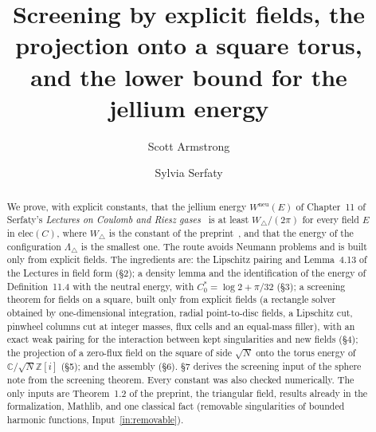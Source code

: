 \documentclass[11pt]{article}
\title{Screening by explicit fields, the projection onto a square torus,\\
and the lower bound for the jellium energy}
\author{Scott Armstrong \and Sylvia Serfaty}
\date{}
\theoremstyle{definition}
\theoremstyle{remark}
\newcommand{\C}{\mathbb C}
\newcommand{\Z}{\mathbb Z}
\newcommand{\Wneu}{W^{\mathrm{neu}}}
\begin{document}
\maketitle

\begin{abstract}
We prove, with explicit constants, that the jellium energy $\Wneu(E)$ of Chapter~11 of Serfaty's
\emph{Lectures on Coulomb and Riesz gases}~\cite{Lectures} is at least $W_\triangle/(2\pi)$ for every field
$E$ in $\mathrm{elec}(C)$, where $W_\triangle$ is the constant of the preprint~\cite{Preprint}, and that the
energy of the configuration $\Lambda_\triangle$ is the smallest one.  The route avoids Neumann problems and is
built only from explicit fields.  The ingredients are: the Lipschitz pairing and Lemma~4.13 of the Lectures in field
form (\S2); a density lemma and the identification of the energy of Definition~11.4 with the neutral energy, with
$C_0^\ast=\log2+\pi/32$ (\S3); a screening theorem for fields on a square, built only from
explicit fields (a rectangle solver obtained by one-dimensional integration, radial point-to-disc fields, a
Lipschitz cut, pinwheel columns cut at integer masses, flux cells and an equal-mass filler), with an exact weak
pairing for the interaction between kept singularities and new fields (\S4); the projection of a zero-flux field
on the square of side $\sqrt N$ onto the torus energy of $\C/\sqrt N\Z[i]$ (\S5); and the assembly (\S6).
\S7 derives the screening input of the sphere note from the screening theorem.  Every constant was also checked
numerically.  The only inputs are Theorem~1.2 of the preprint, the triangular field, results already in the
formalization, Mathlib, and one classical fact (removable singularities of bounded harmonic
functions, Input~\ref{in:removable}).
\end{abstract}
\end{document}
